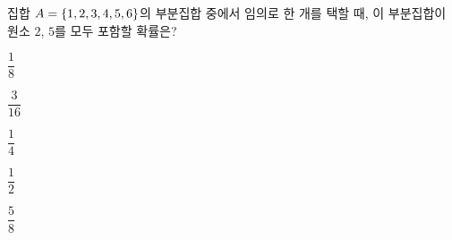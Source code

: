 집합 $A=\{1{,}\mkern3mu\mathopen{}2{,}\mkern3mu\mathopen{}3{,}\mkern3mu\mathopen{}4{,}\mkern3mu\mathopen{}5{,}\mkern3mu\mathopen{}6\}$의 부분집합 중에서 임의로 한 개를 택할 때, 이 부분집합이 원소 $2$, $5$를 모두 포함할 확률은?
\begin{choices32}{\rule[-3ex]{0pt}{8ex}$\dfrac{1}{8}$}{\rule[-3ex]{0pt}{8ex}$\dfrac{3}{16}$}{\rule[-3ex]{0pt}{8ex}$\dfrac{1}{4}$}{\rule[-3ex]{0pt}{8ex}$\dfrac{1}{2}$}{\rule[-3ex]{0pt}{8ex}$\dfrac{5}{8}$}\end{choices32}
